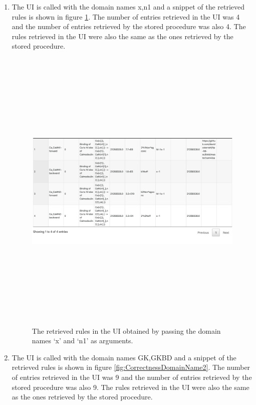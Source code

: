 \documentclass[msc,deptreport,ai]{infthesis}      %
\begin{document}
\begin{enumerate}
	\item The UI is called with the domain names x,n1 and a snippet of the retrieved rules is shown in figure \ref{fig:CorrectnessDomainName1}. The number of entries retrieved in the UI was 4 and the number of entries retrieved by the stored procedure was also 4. 
	The rules retrieved in the UI were also the same as the ones retrieved by the stored procedure. 
	\begin{figure}[H]
		\centering
		\captionsetup{justification=centering}
		\includegraphics[width=\linewidth,height=14cm,keepaspectratio]{CorrectnessDomainName1.png}	
		\caption{The retrieved rules in the UI obtained by passing the domain names `x' and `n1' as arguments.}
		\label{fig:CorrectnessDomainName1}		
	\end{figure}
	\item The UI is called with the domain names GK,GKBD and a snippet of the retrieved rules is shown in figure \ref{fig:CorrectnessDomainName2}. The number of entries retrieved in the UI was 9 and the number of entries retrieved by the stored procedure was also 9. The rules retrieved in the UI were also the same as the ones retrieved by the stored procedure. 
	\begin{figure}[H]
		\centering

\end{figure}
\end{enumerate}
\end{document}
